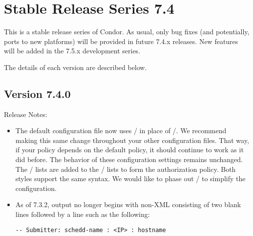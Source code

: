 
\section{\label{sec:History-7-4}Stable Release Series 7.4}

This is a stable release series of Condor.
As usual, only bug fixes (and potentially, ports to new platforms)
will be provided in future 7.4.x releases.
New features will be added in the 7.5.x development series.

The details of each version are described below.

\subsection*{\label{sec:New-7-4-0}Version 7.4.0}

\noindent Release Notes:

\begin{itemize}

\item The default configuration file now uses
  / in place of
  /.  We recommend making this
  same change throughout your other configuration files.  That way,
  if your policy depends on the default policy, it should continue to
  work as it did before.  The behavior of these configuration settings
  remains unchanged.  The / lists are
  added to the / lists to form the
  authorization policy.  Both styles support the same syntax.  We would
  like to phase out / to simplify
  the configuration.

\item As of 7.3.2,   output no longer begins with
non-XML consisting of two blank lines followed by a line such as the
following:

\begin{verbatim}
-- Submitter: schedd-name : <IP> : hostname
\end{verbatim}

\end{itemize}


